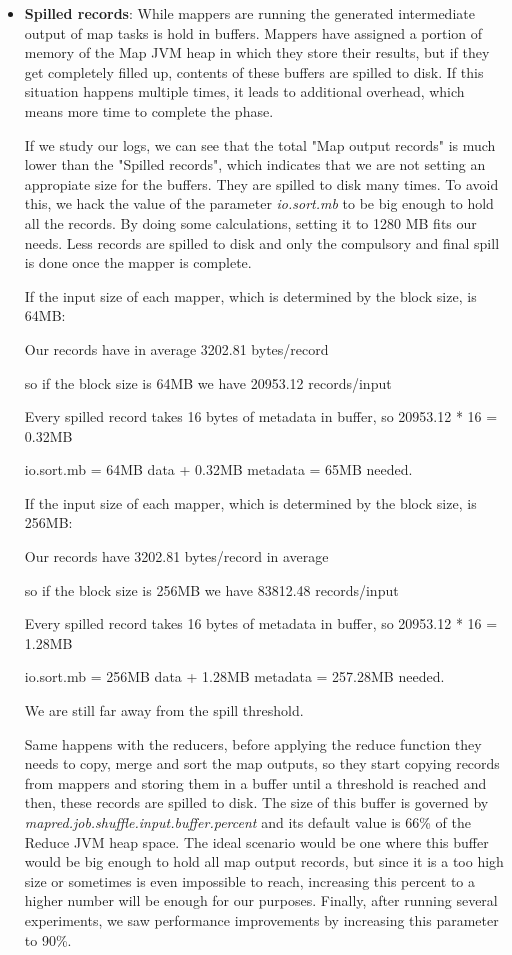 \begin{itemize}
\item \textbf{Spilled records}: While mappers are running the generated intermediate output of map tasks is hold in buffers. Mappers have assigned a portion of memory of the Map JVM heap in which they store their results, but if they get completely filled up, contents of these buffers are spilled to disk. If this situation happens multiple times, it leads to additional overhead, which means more time to complete the phase. 
\par
If we study our logs, we can see that the total "Map output records" is much lower than the "Spilled records", which indicates that we are not setting an appropiate size for the buffers. They are spilled to disk many times. To avoid this, we hack the value of the parameter \textit{io.sort.mb} to be big enough to hold all the records. By doing some calculations, setting it to 1280 MB fits our needs. Less records are spilled to disk and only the compulsory and final spill is done once the mapper is complete.
\par
If the input size of each mapper, which is determined by the block size, is 64MB:
\par
\centerline{Our records have in average 3202.81 bytes/record}
\centerline{so if the block size is 64MB we have 20953.12 records/input}
\centerline{Every spilled record takes 16 bytes of metadata in buffer, so 20953.12 * 16 = 0.32MB}
\centerline{io.sort.mb = 64MB data + 0.32MB metadata = 65MB needed.}
\par
If the input size of each mapper, which is determined by the block size, is 256MB:
\par
\centerline{Our records have 3202.81 bytes/record in average}
\centerline{so if the block size is 256MB we have 83812.48 records/input}
\centerline{Every spilled record takes 16 bytes of metadata in buffer, so 20953.12 * 16 = 1.28MB}
\centerline{io.sort.mb = 256MB data + 1.28MB metadata = 257.28MB needed.}
\bigskip
\par
We are still far away from the spill threshold. 
\par
{}
\par
Same happens with the reducers, before applying the reduce function they needs to copy, merge and sort the map outputs, so they start copying records from mappers and storing them in a buffer until a threshold is reached and then, these records are spilled to disk. The size of this buffer is governed by \textit{mapred.job.shuffle.input.buffer.percent} and its default value is 66\% of the Reduce JVM heap space. The ideal scenario would be one where this buffer would be big enough to hold all map output records, but since it is a too high size or sometimes is even impossible to reach, increasing this percent to a higher number will be enough for our purposes. Finally, after running several experiments, we saw performance improvements by increasing this parameter to 90\%.

\end{itemize}

